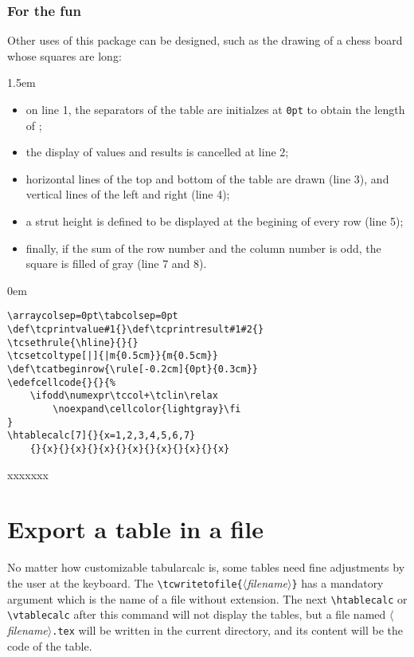 \documentclass[a4paper,10pt]{article}
\newcommand\argu[1]{$\langle$\textit{#1}$\rangle$}
\newcommand\ARGU[1]{\texttt{\{}\argu{#1}\texttt{\}}}
\newcommand\tbcalc{\textsf{tabularcalc}\xspace}
\newcommand\verbinline{\lstinline[breaklines=false,basicstyle=\normalsize\ttfamily]}
\newcommand\mywidth{0.85\linewidth}
\begin{document}
\subsubsection{For the fun}
Other uses of this package can be designed, such as the drawing of a chess board whose squares are  long:\par\nobreak\parindent1.5em
\begin{itemize}
	\item on line 1, the separators of the table are initialzes at \verb|0pt| to obtain the length of ;
	\item the display of values and results is cancelled at line 2;
	\item horizontal lines of the top and bottom of the table are drawn (line 3), and vertical lines of the left and right (line 4);
	\item a strut  height is defined to be displayed at the begining of every row (line 5);
	\item finally, if the sum of the row number and the column number is odd, the square is filled of gray (line 7 and 8).
\end{itemize}\parindent0em
\begin{center}
\begin{minipage}{\mywidth}
\begin{lstlisting}
\arraycolsep=0pt\tabcolsep=0pt
\def\tcprintvalue#1{}\def\tcprintresult#1#2{}
\tcsethrule{\hline}{}{}
\tcsetcoltype[|]{|m{0.5cm}}{m{0.5cm}}
\def\tcatbeginrow{\rule[-0.2cm]{0pt}{0.3cm}}
\edefcellcode{}{}{%
	\ifodd\numexpr\tccol+\tclin\relax
		\noexpand\cellcolor{lightgray}\fi
}
\htablecalc[7]{}{x=1,2,3,4,5,6,7}
	{}{x}{}{x}{}{x}{}{x}{}{x}{}{x}{}{x}
\end{lstlisting}
\end{minipage}

\arraycolsep=0pt\tabcolsep=0pt
\def\tcprintvalue#1{}\def\tcprintresult#1#2{}
\tcsethrule{\hline}{}{}
\def\tcatbeginrow{\rule[-0.2cm]{0pt}{0.3cm}}
	{}{x}{}{x}{}{x}{}{x}{}{x}{}{x}{}{x}
\end{center}

\section{Export a table in a file}
No matter how customizable \tbcalc is, some tables need fine adjustments by the user at the keyboard. The \verbinline=\tcwritetofile=\ARGU{filename} has a mandatory argument which is the name of a file without extension. The next \verbinline=\htablecalc= or \verbinline=\vtablecalc= after this command will not display the tables, but a file named \argu{filename}\verb|.tex| will be written in the current directory, and its content will be the code of the table.\medskip
\end{document}
